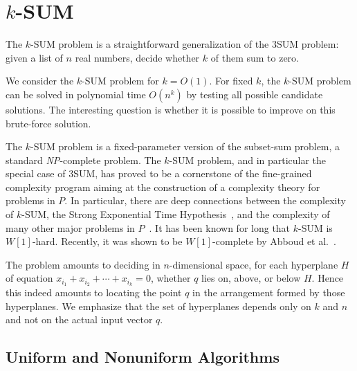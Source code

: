 \section{\(k\)-SUM}


The \(k\)-SUM problem is a straightforward generalization of the 3SUM problem:
given a list of \(n\) real numbers, decide whether \(k\) of them sum to zero.



We consider the \(k\)-SUM problem for \(k=O(1)\).
For fixed \(k\), the \(k\)-SUM problem can be solved in polynomial time
\(O(n^k)\) by testing all possible candidate solutions.
The interesting question is whether it is possible to improve on
this brute-force solution.

The \(k\)-SUM problem is a fixed-parameter version of the subset-sum problem, a
standard \textit{NP}-complete problem. The \(k\)-SUM problem, and in particular
the special case of 3SUM, has proved to be a cornerstone of the fine-grained
complexity program aiming at the construction of a complexity theory for
problems in $P$. In particular, there are deep connections between the
complexity of \(k\)-SUM, the Strong Exponential Time
Hypothesis~\cite{PW10,CGIMPS15}, and the complexity of many other major
problems in
$P$~\cite{GO95,BH99,MO01,P10,ACLL14,AVW14,GP18,KPP14,ALW14,AWY15,CL15}.
It has been known for long that \(k\)-SUM is $W[1]$-hard. Recently, it was shown
to be $W[1]$-complete by Abboud et al.~\cite{ALW14}.

The problem amounts to deciding in $n$-dimensional space, for each hyperplane
\(H\) of equation \(x_{i_1} + x_{i_2} + \cdots +x_{i_k} = 0\), whether \(q\)
lies on, above, or below \(H\). Hence this indeed amounts to locating the point
$q$ in the arrangement formed by those hyperplanes. We emphasize that the set
of hyperplanes depends only on $k$ and $n$ and not on the actual input vector
$q$.

\subsection{Uniform and Nonuniform Algorithms}

